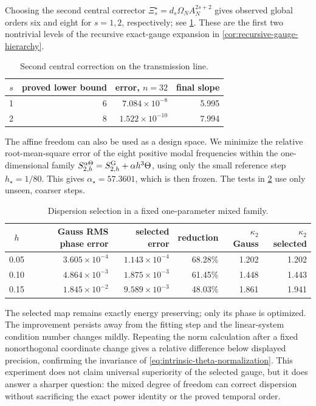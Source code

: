 \documentclass[11pt,a4paper]{article}
\begin{document}
Choosing the second central corrector
\(\Xi_s^\star=d_s\Omega_NA_N^{2s+2}\) gives observed global orders six
and eight for \(s=1,2\), respectively; see
\cref{tab:second-central-corrector}.  These are the first two nontrivial
levels of the recursive exact-gauge expansion in
\cref{cor:recursive-gauge-hierarchy}.

\begin{table}[htbp]
\centering
\caption{Second central correction on the transmission line.}
\label{tab:second-central-corrector}
\begin{tabular}{@{}crrr@{}}
\toprule
\(s\) & proved lower bound & error, \(n=32\) & final slope \\ \midrule
1 & 6 & \(7.084\times10^{-8}\) & 5.995\\
2 & 8 & \(1.522\times10^{-10}\) & 7.994\\
\bottomrule
\end{tabular}
\end{table}

The affine freedom can also be used as a design space.  We minimize the
relative root-mean-square error of the eight positive modal frequencies
within the one-dimensional family
\(S_{2,h}^{\alpha\Theta}=S^{\rm G}_{2,h}+\alpha h^3\Theta\), using only
the small reference step \(h_\star=1/80\).  This gives
\(\alpha_\star=57.3601\), which is then frozen.  The tests in
\cref{tab:dispersion-selector} use only unseen, coarser steps.

\begin{table}[H]
\centering
\caption{Dispersion selection in a fixed one-parameter mixed family.}
\label{tab:dispersion-selector}
\begin{tabular}{@{}crrrrr@{}}
\toprule
\(h\) & Gauss RMS phase error & selected error & reduction
& \(\kappa_2\) Gauss & \(\kappa_2\) selected \\ \midrule
0.05 & \(3.605\times10^{-4}\) & \(1.143\times10^{-4}\) & 68.28\% & 1.202 & 1.202\\
0.10 & \(4.864\times10^{-3}\) & \(1.875\times10^{-3}\) & 61.45\% & 1.448 & 1.443\\
0.15 & \(1.845\times10^{-2}\) & \(9.589\times10^{-3}\) & 48.03\% & 1.861 & 1.941\\
\bottomrule
\end{tabular}
\end{table}

The selected map remains exactly energy preserving; only its phase is
optimized.  The improvement persists away from the fitting step and the
linear-system condition number changes mildly.  Repeating the norm
calculation after a fixed nonorthogonal coordinate change gives a relative
difference below displayed precision, confirming the invariance of
\cref{eq:intrinsic-theta-normalization}.  This experiment does not claim
universal superiority of the selected gauge, but it does answer a sharper
question: the mixed degree of freedom can correct dispersion without
sacrificing the exact power identity or the proved temporal order.
\end{document}
